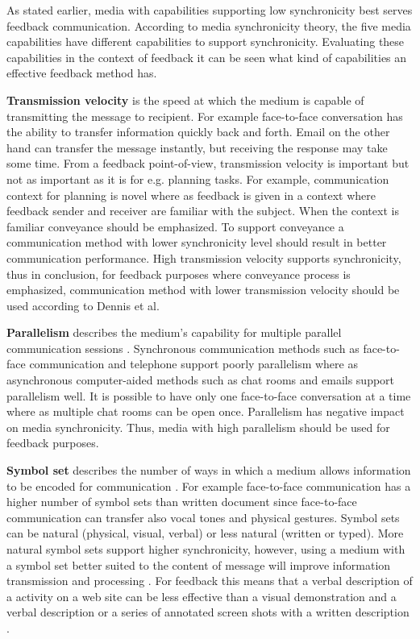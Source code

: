 \documentclass[conference]{IEEEtran}
\begin{document}
As stated earlier, media with capabilities supporting low synchronicity best serves feedback communication. According to media synchronicity theory, the five media capabilities have different capabilities to support synchronicity. Evaluating these capabilities in the context of feedback it can be seen what kind of capabilities an effective feedback method has.

\textbf{Transmission velocity} is the speed at which the medium is capable of transmitting the message to recipient. For example face-to-face conversation has the ability to transfer information quickly back and forth. Email on the other hand can transfer the message instantly, but receiving the response may take some time. From a feedback point-of-view, transmission velocity is important but not as important as it is for e.g. planning tasks. For example, communication context for planning is novel where as feedback is given in a context where feedback sender and receiver are familiar with the subject. When the context is familiar conveyance should be emphasized. To support conveyance a communication method with lower synchronicity level should result in better communication performance. High transmission velocity supports synchronicity, thus in conclusion, for feedback purposes where conveyance process is emphasized, communication method with lower transmission velocity should be used according to Dennis et al. \cite{2008dennis}

\textbf{Parallelism} describes the medium's capability for multiple parallel communication sessions \cite{2008dennis}. Synchronous communication methods such as face-to-face communication and telephone support poorly parallelism where as asynchronous computer-aided methods such as chat rooms and emails support parallelism well. It is possible to have only one face-to-face conversation at a time where as multiple chat rooms can be open once. Parallelism has negative impact on media synchronicity. Thus, media with high parallelism should be used for feedback purposes. \cite{2008dennis}

\textbf{Symbol set} describes the number of ways in which a medium allows information to be encoded for communication \cite{2008dennis}. For example face-to-face communication has a higher number of symbol sets than written document since face-to-face communication can transfer also vocal tones and physical gestures. Symbol sets can be natural (physical, visual, verbal) or less natural (written or typed). More natural symbol sets support higher synchronicity, however, using a medium with a symbol set better suited to the content of message will improve information transmission and processing \cite{2008dennis}. For feedback this means that a verbal description of a activity on a web site can be less effective than a visual demonstration and a verbal description or a series of annotated screen shots with a written description \cite{2008dennis}.
\end{document}
